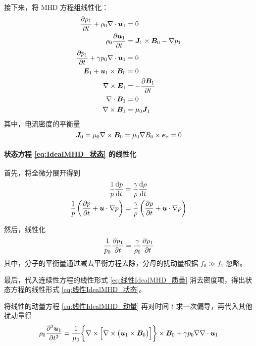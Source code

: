 接下来，将 MHD 方程组线性化：
\begin{subequations}\begin{align}
\frac{\partial {\rho_1}}{\partial {t}} + \rho_0 \nabla \cdot {\bm{u}_1} &= 0
\label{eq:线性IdealMHD_质量} \\
\rho_0 \frac{\partial {\bm{u}_1}}{\partial {t}} &= \bm{J}_1 \times \bm{B}_0 - \nabla {p_1}
\label{eq:线性IdealMHD_动量} \\
\frac{\partial {p_1}}{\partial {t}} + \gamma p_0 \nabla \cdot {\bm{u}_1} &= 0
\label{eq:线性IdealMHD_状态} \\
\bm{E}_1 + \bm{u}_1 \times \bm{B}_0 &= 0 \\
\nabla \times {\bm{E}_1} &= - \frac{\partial {\bm{B}_1}}{\partial {t}} \\
\nabla \cdot {\bm{B}_1} &= 0 \\
\nabla \times {\bm{B}_1} &= \mu_0 \bm{J}_1
\end{align}\end{subequations}
其中，电流密度的平衡量
\begin{equation}
\bm{J}_0 = \mu_0 \nabla \times {\bm{B}_0} = \mu_0 \nabla {B_0} \times \bm{e}_z = 0
\end{equation}

\paragraph{状态方程 \ref{eq:IdealMHD_状态} 的线性化}
首先，将全微分展开得到
\begin{equation}\begin{aligned}
\frac{1}{p} \frac{\mathop{}\!\mathrm{d} {p}}{\mathop{}\!\mathrm{d} {t}} &= \frac{\gamma}{\rho} \frac{\mathop{}\!\mathrm{d} {\rho}}{\mathop{}\!\mathrm{d} {t}} \\
\frac{1}{p} \left(\frac{\partial {p}}{\partial {t}} + \bm{u} \cdot \nabla {p}\right)
&= \frac{\gamma}{\rho} \left(\frac{\partial {\rho}}{\partial {t}} + \bm{u} \cdot \nabla {\rho}\right)
\end{aligned}\end{equation}

然后，线性化
\begin{equation}
\frac{1}{p_0} \frac{\partial {p_1}}{\partial {t}}
= \frac{\gamma}{\rho_0} \frac{\partial {\rho_1}}{\partial {t}}
\end{equation}
其中，分子的平衡量通过减去平衡方程去除，分母的扰动量根据 $f_0 \gg f_1$ 忽略。

最后，代入连续性方程的线性形式 \ref{eq:线性IdealMHD_质量} 消去密度项，得出状态方程的线性形式 \ref{eq:线性IdealMHD_状态}。

将线性的动量方程 \ref{eq:线性IdealMHD_动量} 再对时间 $t$ 求一次偏导，再代入其他扰动量得
\begin{equation}
\rho_0 \frac{\partial^2 {\bm{u}_1}}{\partial {t}^2}
= \frac{1}{\mu_0} \bigg\{ \nabla \times {\Big[ \nabla \times {\big( \bm{u}_1 \times \bm{B}_0 \big)} \Big]} \bigg\} \times \bm{B}_0
+ \gamma p_0 \nabla {\nabla \cdot {\bm{u}_1}}
\end{equation}

